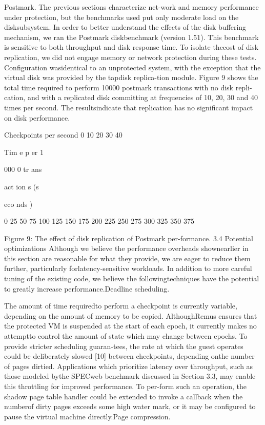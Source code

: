 Postmark. The previous sections characterize net-work and memory performance under protection, but the
benchmarks used put only moderate load on the disksubsystem. In order to better understand the effects of
the disk buffering mechanism, we ran the Postmark diskbenchmark (version 1.51). This benchmark is sensitive
to both throughput and disk response time. To isolate thecost of disk replication, we did not engage memory or
network protection during these tests. Configuration wasidentical to an unprotected system, with the exception
that the virtual disk was provided by the tapdisk replica-tion module. Figure 9 shows the total time required to
perform 10000 postmark transactions with no disk repli-cation, and with a replicated disk committing at frequencies of 10, 20, 30 and 40 times per second. The resultsindicate that replication has no significant impact on disk
performance.

Checkpoints per second
0 10 20 30 40

Tim
e p
er 1

000
0 tr
ans

act
ion
s (s

eco
nds
)

0
25
50
75
100
125
150
175
200
225
250
275
300
325
350
375

Figure 9: The effect of disk replication of Postmark per-formance.
3.4 Potential optimizations
Although we believe the performance overheads shownearlier in this section are reasonable for what they provide, we are eager to reduce them further, particularly forlatency-sensitive workloads. In addition to more careful tuning of the existing code, we believe the followingtechniques have the potential to greatly increase performance.Deadline scheduling.

The amount of time requiredto perform a checkpoint is currently variable, depending on the amount of memory to be copied. AlthoughRemus ensures that the protected VM is suspended at
the start of each epoch, it currently makes no attemptto control the amount of state which may change between epochs. To provide stricter scheduling guaran-tees, the rate at which the guest operates could be deliberately slowed [10] between checkpoints, depending onthe number of pages dirtied. Applications which prioritize latency over throughput, such as those modeled bythe SPECweb benchmark discussed in Section 3.3, may
enable this throttling for improved performance. To per-form such an operation, the shadow page table handler
could be extended to invoke a callback when the numberof dirty pages exceeds some high water mark, or it may
be configured to pause the virtual machine directly.Page compression.

